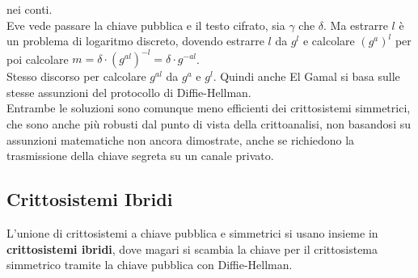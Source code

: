 \documentclass[a4paper,12pt, oneside]{book}
\begin{document}
nei conti.\\ 
Eve vede passare la chiave pubblica e il testo cifrato, sia $\gamma$ che
$\delta$. Ma estrarre $l$ è un problema di logaritmo discreto, dovendo estrarre
$l$ da $g^l$ e calcolare $(g^a)^l$ per poi calcolare $m=\delta\cdot
(g^{al})^{-l}=\delta\cdot g^{-al}$.\\
Stesso discorso per calcolare $g^{al}$ da $g^a$ e $g^l$. Quindi anche El Gamal
si basa sulle stesse assunzioni del protocollo di Diffie-Hellman.\\
Entrambe le soluzioni sono comunque meno efficienti dei crittosistemi
simmetrici, che sono anche più robusti dal punto di vista della crittoanalisi,
non basandosi su assunzioni matematiche non ancora dimostrate,
anche se richiedono la trasmissione della chiave segreta su un canale privato.
\subsection{Crittosistemi Ibridi}
L'unione di crittosistemi a chiave pubblica e simmetrici si usano insieme in
\textbf{crittosistemi ibridi}, dove magari si scambia la chiave per il
crittosistema simmetrico tramite la chiave pubblica con Diffie-Hellman.
\end{document}

